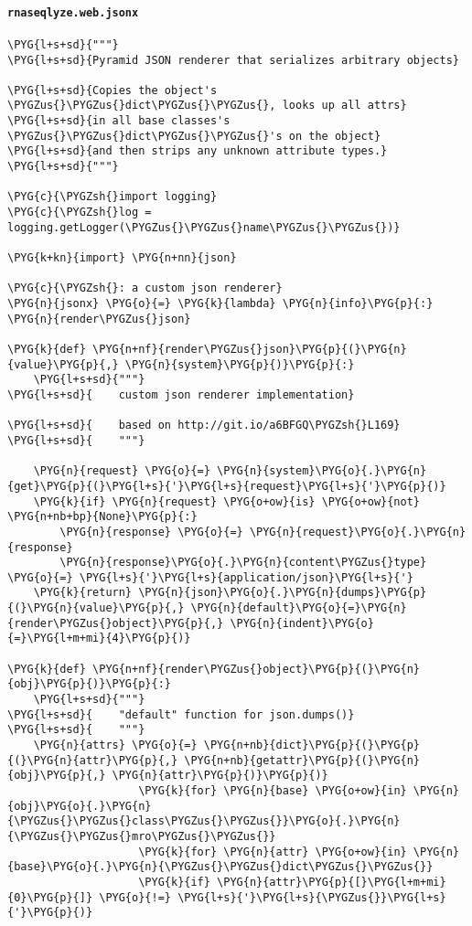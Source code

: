 \paragraph{\texttt{rnaseqlyze.web.jsonx}}
\label{index-pdf4:rnaseqlyze-web-jsonx}
\begin{Verbatim}[commandchars=\\\{\}]
\PYG{l+s+sd}{"""}
\PYG{l+s+sd}{Pyramid JSON renderer that serializes arbitrary objects}

\PYG{l+s+sd}{Copies the object's \PYGZus{}\PYGZus{}dict\PYGZus{}\PYGZus{}, looks up all attrs}
\PYG{l+s+sd}{in all base classes's \PYGZus{}\PYGZus{}dict\PYGZus{}\PYGZus{}'s on the object}
\PYG{l+s+sd}{and then strips any unknown attribute types.}
\PYG{l+s+sd}{"""}

\PYG{c}{\PYGZsh{}import logging}
\PYG{c}{\PYGZsh{}log = logging.getLogger(\PYGZus{}\PYGZus{}name\PYGZus{}\PYGZus{})}

\PYG{k+kn}{import} \PYG{n+nn}{json}

\PYG{c}{\PYGZsh{}: a custom json renderer}
\PYG{n}{jsonx} \PYG{o}{=} \PYG{k}{lambda} \PYG{n}{info}\PYG{p}{:} \PYG{n}{render\PYGZus{}json}

\PYG{k}{def} \PYG{n+nf}{render\PYGZus{}json}\PYG{p}{(}\PYG{n}{value}\PYG{p}{,} \PYG{n}{system}\PYG{p}{)}\PYG{p}{:}
    \PYG{l+s+sd}{"""}
\PYG{l+s+sd}{    custom json renderer implementation}

\PYG{l+s+sd}{    based on http://git.io/a6BFGQ\PYGZsh{}L169}
\PYG{l+s+sd}{    """}

    \PYG{n}{request} \PYG{o}{=} \PYG{n}{system}\PYG{o}{.}\PYG{n}{get}\PYG{p}{(}\PYG{l+s}{'}\PYG{l+s}{request}\PYG{l+s}{'}\PYG{p}{)}
    \PYG{k}{if} \PYG{n}{request} \PYG{o+ow}{is} \PYG{o+ow}{not} \PYG{n+nb+bp}{None}\PYG{p}{:}
        \PYG{n}{response} \PYG{o}{=} \PYG{n}{request}\PYG{o}{.}\PYG{n}{response}
        \PYG{n}{response}\PYG{o}{.}\PYG{n}{content\PYGZus{}type} \PYG{o}{=} \PYG{l+s}{'}\PYG{l+s}{application/json}\PYG{l+s}{'}
    \PYG{k}{return} \PYG{n}{json}\PYG{o}{.}\PYG{n}{dumps}\PYG{p}{(}\PYG{n}{value}\PYG{p}{,} \PYG{n}{default}\PYG{o}{=}\PYG{n}{render\PYGZus{}object}\PYG{p}{,} \PYG{n}{indent}\PYG{o}{=}\PYG{l+m+mi}{4}\PYG{p}{)}

\PYG{k}{def} \PYG{n+nf}{render\PYGZus{}object}\PYG{p}{(}\PYG{n}{obj}\PYG{p}{)}\PYG{p}{:}
    \PYG{l+s+sd}{"""}
\PYG{l+s+sd}{    "default" function for json.dumps()}
\PYG{l+s+sd}{    """}
    \PYG{n}{attrs} \PYG{o}{=} \PYG{n+nb}{dict}\PYG{p}{(}\PYG{p}{(}\PYG{n}{attr}\PYG{p}{,} \PYG{n+nb}{getattr}\PYG{p}{(}\PYG{n}{obj}\PYG{p}{,} \PYG{n}{attr}\PYG{p}{)}\PYG{p}{)}
                    \PYG{k}{for} \PYG{n}{base} \PYG{o+ow}{in} \PYG{n}{obj}\PYG{o}{.}\PYG{n}{\PYGZus{}\PYGZus{}class\PYGZus{}\PYGZus{}}\PYG{o}{.}\PYG{n}{\PYGZus{}\PYGZus{}mro\PYGZus{}\PYGZus{}}
                    \PYG{k}{for} \PYG{n}{attr} \PYG{o+ow}{in} \PYG{n}{base}\PYG{o}{.}\PYG{n}{\PYGZus{}\PYGZus{}dict\PYGZus{}\PYGZus{}}
                    \PYG{k}{if} \PYG{n}{attr}\PYG{p}{[}\PYG{l+m+mi}{0}\PYG{p}{]} \PYG{o}{!=} \PYG{l+s}{'}\PYG{l+s}{\PYGZus{}}\PYG{l+s}{'}\PYG{p}{)}


\end{Verbatim}
